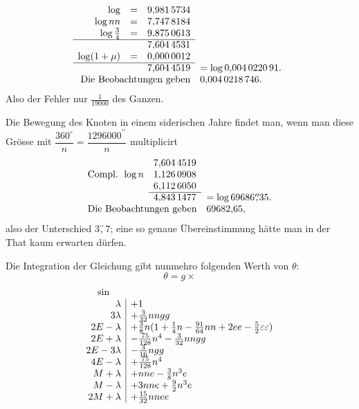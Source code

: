 \setlength{\arraycolsep}{2pt}
\renewcommand{\arraystretch}{1.15}
\[
\begin{array}{rcll}
\log&=&9{,}981\,5734&\\
\log nn&=&7{,}747\,8184&\\
\log\tfrac34&=&9{,}875\,0613&\\
\cline{1-3}
&&7{,}604\,4531&\\
\log(1+\mu)&=&0{,}000\,0012&\\
\cline{1-3}
&&7{,}604\,4519&=\log0{,}004\,0220\,91.\\
\multicolumn{3}{r}{\text{Die Beobachtungen geben}}&0{,}004\,0218\,746.
\end{array}
\]
\endgroup
\noindent Also der Fehler nur \(\tfrac1{19000}\) des Ganzen.
\par\noindent\hspace*{\parindent}Die Bewegung des Knoten in einem siderischen Jahre findet man, wenn
man diese Grösse mit \(\dfrac{360^\circ}{n}=\dfrac{1296000^{\prime\prime}}{n}\) multiplicirt
\begingroup\small
\setlength{\arraycolsep}{2pt}
\renewcommand{\arraystretch}{1.15}
\[
\begin{array}{rll}
&7{,}604\,4519&\\
\text{Compl. }\log n&1{,}126\,0908&\\
&6{,}112\,6050&\\
\cline{2-2}
&4{,}843\,1477&=\log69686\overset{\prime\prime}{,}35.\\
\multicolumn{2}{r}{\text{Die Beobachtungen geben}}&69682{,}65,
\end{array}
\]
\endgroup
\noindent also der Unterschied \(3\overset{\prime\prime}{,}7\); eine so genaue Übereinstimmung hätte man in der
That kaum erwarten dürfen.
\par\noindent\hspace*{\parindent}Die Integration der Gleichung gibt nunmehro folgenden Werth von \(\theta\):
\[
\theta=g\times
\]
\begingroup\small
\setlength{\arraycolsep}{4pt}
\renewcommand{\arraystretch}{1.3}
\[
\begin{array}{r|l}
\multicolumn{1}{c}{\sin}&\\
\lambda&+1\\
3\lambda&+\tfrac3{32}nngg\\
2E-\lambda&+\tfrac38n(1+\tfrac14n-\tfrac{91}{64}nn+2ee-\tfrac52\varepsilon\varepsilon)\\
2E+\lambda&-\tfrac{75}{128}n^4-\tfrac3{32}nngg\\
2E-3\lambda&-\tfrac3{16}ngg\\
4E-\lambda&+\tfrac{75}{128}n^4\\
M+\lambda&+nne-\tfrac38n^3e\\
M-\lambda&+3nne+\tfrac92n^3e\\
2M+\lambda&+\tfrac{15}{32}nnee
\end{array}
\]
